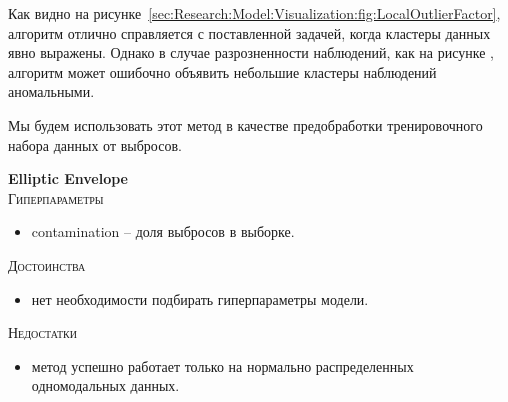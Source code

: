 \documentclass[12pt]{article}
\begin{document}
    \par Как видно на рисунке~\ref{sec:Research:Model:Visualization:fig:LocalOutlierFactor}, алгоритм отлично справляется с поставленной задачей, когда кластеры данных явно выражены. Однако в случае разрозненности наблюдений, как на рисунке , алгоритм может ошибочно объявить небольшие кластеры наблюдений аномальными.

    \par Мы будем использовать этот метод в качестве предобработки тренировочного набора данных от выбросов.

    \newpage


    \textbf{Elliptic Envelope} \\

    \noindent \textsc{Гиперпараметры}
    \begin{itemize}
        \item contamination – доля выбросов в выборке.
    \end{itemize}

    \noindent \textsc{Достоинства}
    \begin{itemize}
        \item нет необходимости подбирать гиперпараметры модели.
    \end{itemize}

    \noindent \textsc{Недостатки}
    \begin{itemize}
        \item метод успешно работает только на нормально распределенных одномодальных данных.
    \end{itemize}
\end{document}
